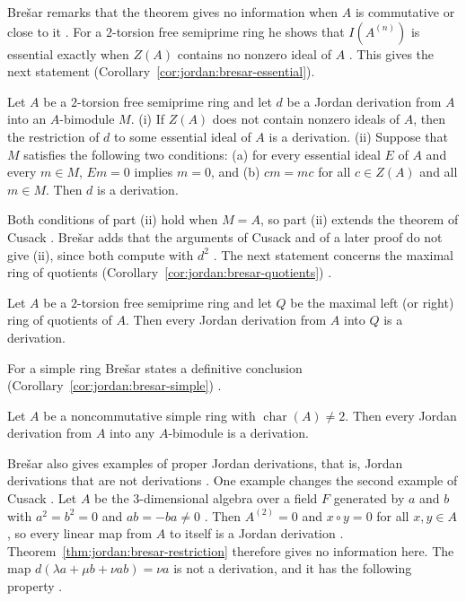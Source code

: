 Brešar remarks that the theorem gives no information when $A$ is commutative
or close to it \cite[p.~411]{Bresar2005}. For a $2$-torsion free semiprime
ring he shows that $I(A^{(n)})$ is essential exactly when $Z(A)$ contains no
nonzero ideal of $A$ \cite[Lemma~3.7, p.~416]{Bresar2005}. This gives the next
statement (Corollary~\ref{cor:jordan:bresar-essential}).

\begin{corollary}\label{cor:jordan:bresar-essential}
Let $A$ be a $2$-torsion free semiprime ring and let $d$ be a Jordan derivation from $A$
into an $A$-bimodule $M$.
(i) If $Z(A)$ does not contain nonzero ideals of $A$, then the restriction of $d$ to
some essential ideal of $A$ is a derivation.
(ii) Suppose that $M$ satisfies the following two conditions: (a) for every essential
ideal $E$ of $A$ and every $m\in M$, $Em=0$ implies $m=0$, and (b) $cm=mc$ for all
$c\in Z(A)$ and all $m\in M$. Then $d$ is a derivation.
\end{corollary}

Both conditions of part (ii) hold when $M=A$, so part (ii) extends the theorem
of Cusack \cite[p.~416]{Bresar2005}. Brešar adds that the arguments of Cusack
and of a later proof do not give (ii), since both compute with $d^{2}$
\cite[p.~416]{Bresar2005}. The next statement concerns the maximal ring of
quotients (Corollary~\ref{cor:jordan:bresar-quotients}) \cite[Corollary~3.9,
p.~417]{Bresar2005}.

\begin{corollary}\label{cor:jordan:bresar-quotients}
Let $A$ be a $2$-torsion free semiprime ring and let $Q$ be the maximal left (or right)
ring of quotients of $A$. Then every Jordan derivation from $A$ into $Q$ is a
derivation.
\end{corollary}

For a simple ring Brešar states a definitive conclusion
(Corollary~\ref{cor:jordan:bresar-simple}) \cite[p.~417]{Bresar2005}.

\begin{corollary}\label{cor:jordan:bresar-simple}
Let $A$ be a noncommutative simple ring with $\operatorname{char}(A)\neq2$. Then every
Jordan derivation from $A$ into any $A$-bimodule is a derivation.
\end{corollary}


Brešar also gives examples of proper Jordan derivations, that is, Jordan
derivations that are not derivations \cite[p.~411]{Bresar2005}. One example
changes the second example of Cusack \cite[\S4.2, p.~419]{Bresar2005}. Let $A$
be the $3$-dimensional algebra over a field $F$ generated by $a$ and $b$ with
$a^{2}=b^{2}=0$ and $ab=-ba\neq0$ \cite[\S4.2, p.~419]{Bresar2005}. Then
$A^{(2)}=0$ and $x\circ y=0$ for all $x,y\in A$, so every linear map from $A$
to itself is a Jordan derivation \cite[\S4.2, p.~419]{Bresar2005}.
Theorem~\ref{thm:jordan:bresar-restriction} therefore gives no information
here. The map $d(\lambda a+\mu b+\nu ab)=\nu a$ is not a derivation, and it
has the following property \cite[\S4.2, p.~419]{Bresar2005}.

